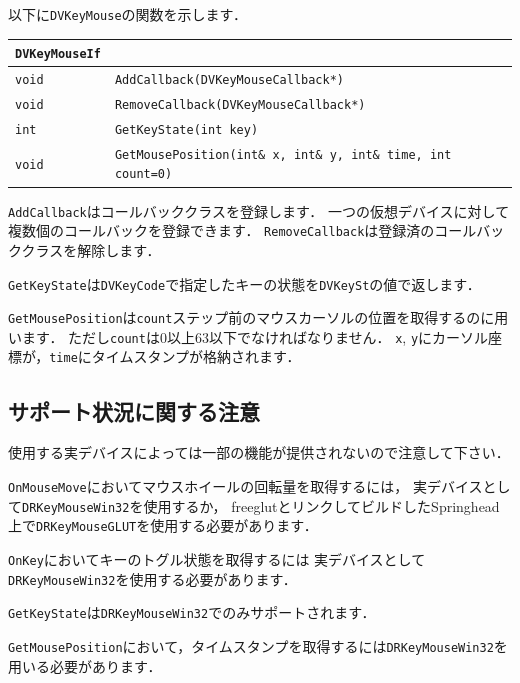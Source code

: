 \KLUDGE 以下に\texttt{DVKeyMouse}\KLUDGE の関数を示します．
\begin{center}
\begin{tabular}{p{.1\hsize}p{.8\hsize}}
\texttt{DVKeyMouseIf}																		\\ \midrule
\texttt{void}	& \texttt{AddCallback(DVKeyMouseCallback*)} 	\\
\texttt{void}	& \texttt{RemoveCallback(DVKeyMouseCallback*)} 	\\
\texttt{int}	& \texttt{GetKeyState(int key)}					\\
\texttt{void}	& \texttt{GetMousePosition(int\& x, int\& y, int\& time, int count=0)}
\end{tabular}
\end{center}
\texttt{AddCallback}\KLUDGE はコールバッククラスを登録します．
\KLUDGE 一つの仮想デバイスに対して複数個のコールバックを登録できます．
\texttt{RemoveCallback}\KLUDGE は登録済のコールバッククラスを解除します．

\texttt{GetKeyState}\KLUDGE は\texttt{DVKeyCode}\KLUDGE で指定したキーの状態を\texttt{DVKeySt}\KLUDGE の値で返します．

\texttt{GetMousePosition}\KLUDGE は\texttt{count}\KLUDGE ステップ前のマウスカーソルの位置を取得するのに用います．
\KLUDGE ただし\texttt{count}\KLUDGE は$0$\KLUDGE 以上$63$\KLUDGE 以下でなければなりません．
\texttt{x}, \texttt{y}\KLUDGE にカーソル座標が，\texttt{time}\KLUDGE にタイムスタンプが格納されます．

\subsection*{\KLUDGE サポート状況に関する注意}

\KLUDGE 使用する実デバイスによっては一部の機能が提供されないので注意して下さい．

\texttt{OnMouseMove}\KLUDGE においてマウスホイールの回転量を取得するには，
\KLUDGE 実デバイスとして\texttt{DRKeyMouseWin32}\KLUDGE を使用するか，
freeglut\KLUDGE とリンクしてビルドしたSpringhead\KLUDGE 上で\texttt{DRKeyMouseGLUT}\KLUDGE を使用する必要があります．

\texttt{OnKey}\KLUDGE においてキーのトグル状態を取得するには
\KLUDGE 実デバイスとして\texttt{DRKeyMouseWin32}\KLUDGE を使用する必要があります．

\texttt{GetKeyState}\KLUDGE は\texttt{DRKeyMouseWin32}\KLUDGE でのみサポートされます．

\texttt{GetMousePosition}\KLUDGE において，タイムスタンプを取得するには\texttt{DRKeyMouseWin32}\KLUDGE を用いる必要があります．

